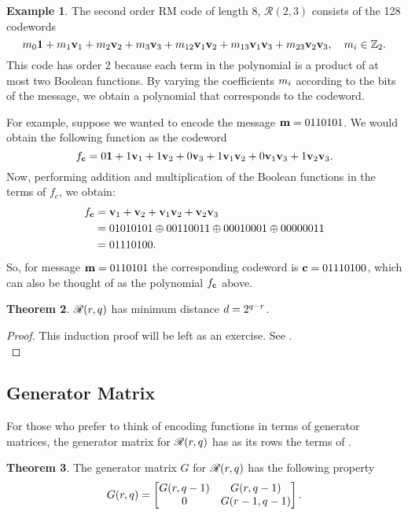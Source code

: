 \documentclass[12pt,twoside]{reedthesis}
\theoremstyle{definition}
\newtheorem{theorem}{Theorem}[chapter]
\newtheorem{example}[theorem]{Example}
\newcommand{\Z}{\mathbb{Z}}
\begin{document}
\begin{example}
The second order RM code of length 8, $\mathscr{R}(2,3)$ consists of the 128 codewords
\begin{equation*} 
\m{0}\consto + \m{1}\bv{1} + \m{2}\bv{2} + \m{3}\bv{3} + \m{12}\bv{1}\bv{2} + \m{13}\bv{1}\bv{3} + \m{23}\bv{2}\bv{3}, \quad \m{i} \in \Z_2. 
\end{equation*}
This code has order 2 because each term in the polynomial is a product of at most two Boolean functions. By varying the coefficients $m_{i}$ according to the bits of the message, we obtain a polynomial that corresponds to the codeword. 

For example, suppose we wanted to encode the message $\mathbf{m} = 0110101$. We would obtain the following function as the codeword
\begin{equation*}
f_\mathbf{c} = 0\mathbf{1} + 1\mathbf{v}_{1} + 1\mathbf{v}_{2} + 0\mathbf{v}_{3} + 1\mathbf{v}_{1}\mathbf{v}_{2} + 0\mathbf{v}_{1}\mathbf{v}_{3} + 1\mathbf{v}_{2}\mathbf{v}_{3}.
\end{equation*}
Now, performing addition and multiplication of the Boolean functions in the terms of $f_c$, we obtain: 
\begin{align*}
f_\mathbf{c} 
& =  \mathbf{v}_{1} + \mathbf{v}_{2} + \mathbf{v}_{1}\mathbf{v}_{2} + \mathbf{v}_{2}\mathbf{v}_{3}\\
& = 01010101 \oplus 00110011 \oplus 00010001 \oplus 00000011 \\
& = 01110100.
\end{align*}
So, for message $\mathbf{m} = 0110101$ the corresponding codeword is $\mathbf{c}=01110100$, which can also be thought of as the polynomial $f_\mathbf{c}$ above.
\end{example}


\begin{theorem} 
$\mathscr{R}(r,q)$ has minimum distance $d = 2^{q-r}$.
\end{theorem}
\begin{proof}
This induction proof will be left as an exercise. See \citep{macwilliamssloane}.\\
\end{proof}
\subsection{Generator Matrix}
For those who prefer to think of encoding functions in terms of generator matrices, the generator matrix for $\mathscr{R}(r,q)$ has as its rows the terms of \rmexp.

\begin{theorem} The generator matrix $G$ for $\mathscr{R}(r, q)$ has the following property
\begin{equation*}
G(r, q) = 
\begin{bmatrix}
G(r, q-1) & G(r, q-1) \\
0 & G(r-1,q-1)
\end{bmatrix} .
\end{equation*}
\end{theorem}
\end{document}
